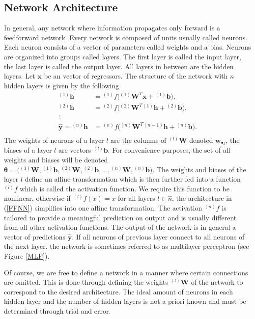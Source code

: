 \documentclass[11pt,oneside,czech,american]{book} %
\theoremstyle{definition} %
\theoremstyle{definition}
\begin{document}
\subsection*{Network Architecture}
In general, any network where information propagates only forward is a feedforward network. Every network is composed of units usually called neurons. Each neuron consists of a vector of parameters called weights and a bias. Neurons are organized into groups called layers. The first layer is called the input layer, the last layer is called the output layer. All layers in between are the hidden layers. Let $\bm{x}$ be an vector of regressors. The structure of the network with $n$ hidden layers is given by the following
\begin{equation}
	\begin{aligned}
		{}^{(1)}\bm{h} &= {}^{(1)}f\Big({}^{(1)}\bm{W}^{T}\bm{x} + {}^{(1)}\bm{b}\Big), \\
		{}^{(2)}\bm{h} &= {}^{(2)}f\Big({}^{(2)}\bm{W}^{T} {}^{(1)}\bm{h} + {}^{(2)}\bm{b}\Big), \\
		\vdots \\
		\hat{\bm{y}} = {}^{(n)}\bm{h} &= {}^{(n)}f\Big({}^{(n)}\bm{W}^{T} {}^{(n-1)}\bm{h} + {}^{(n)}\bm{b}\Big). \\
	\end{aligned}
\label{FFNN}
\end{equation}
The weights of neurons of a layer $l$ are the columns of ${}^{(l)}\bm{W}$ denoted $\bm{w}_{\bullet j}$, the biases of a layer $l$ are vectors ${}^{(l)}\bm{b}$. For convenience purposes, the set of all weights and biases will be denoted $\bm{\theta} = \Big( {}^{(1)}\bm{W}, {}^{(1)}\bm{b}, {}^{(2)}\bm{W},{}^{(2)}\bm{b}, \dots, {}^{(n)}\bm{W}, {}^{(n)}\bm{b}\Big)$. The weights and biases of the layer $l$ define an affine transformation which is then further fed into a function ${}^{(l)}f$ which is called the activation function. We require this function to be nonlinear, otherwise if ${}^{(l)}f(x) = x$ for all layers $l \in \hat{n}$, the architecture in (\ref{FFNN}) simplifies into one affine transformation. The activation ${}^{(n)}f$ is tailored to provide a meaningful prediction on output and is usually different from all other activation functions. The output of the network is in general a vector of predictions $\hat{\bm{y}}$. If all neurons of previous layer connect to all neurons of the next layer, the network is sometimes referred to as multilayer perceptron (see Figure \ref{MLP}).

Of course, we are free to define a network in a manner where certain connections are omitted. This is done through defining the weights ${}^{(l)}\bm{W}$ of the network to correspond to the desired architecture. The ideal amount of neurons in each hidden layer and the number of hidden layers is not a priori known and must be determined through trial and error.
\end{document}
